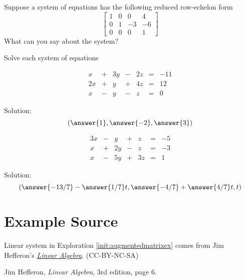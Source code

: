 \documentclass{ximera}
\begin{document}
\begin{problem} \label{prob:numberofsolutionsmultch}
Suppose a system of equations has the following reduced row-echelon form
  $$\left[\begin{array}{ccc|c}  
 1&0&0&4\\0&1&-3&-6\\0&0&0&1
 \end{array}\right]$$
 What can you say about the system?
 \begin{multipleChoice}
 \end{multipleChoice}
  \end{problem}
\begin{problem}
Solve each system of equations
\begin{problem}\label{prob:sys20solvesys1}
$$\begin{array}{ccccccc}
      x & +&3y&-&2z&= &-11 \\
	 2x& +&y&+&4z&=&12\\
     x& -&y&-&z&=&0
    \end{array}$$
    
    Solution:
    $$( \answer{1}, \answer{-2}, \answer{3})$$
\end{problem}

\begin{problem}\label{prob:sys20solvesys2}
$$\begin{array}{ccccccc}
      3x & -&y&+&z&= &-5 \\
	 x& +&2y&-&z&=&-3\\
     x& -&5y&+&3z&=&1
    \end{array}$$
    
    Solution:
    $$\left(\answer{-13/7}-\answer{1/7}t, \answer{-4/7}+\answer{4/7}t, t\right)$$
\end{problem}
\end{problem}

\section*{Example Source} 

Linear system in Exploration \ref{init:augmentedmatrixex} comes from Jim Hefferon's \href{http://joshua.smcvt.edu/linearalgebra/#current_version}{\it Linear Algebra}. (CC-BY-NC-SA)

Jim Hefferon, {\it Linear Algebra}, 3rd edition, page 6.
\end{document}
